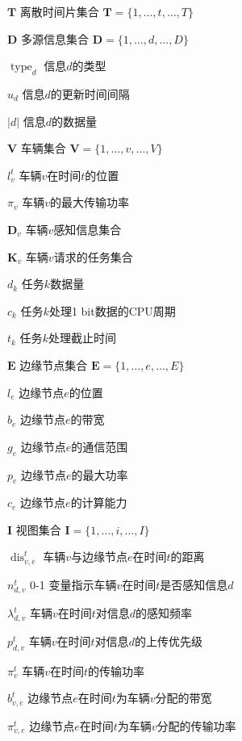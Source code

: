 \begin{denotation}[20mm][15mm]
	\item[$\mathbf{T}$] 离散时间片集合 $\mathbf{T}=\{1, \ldots, t, \ldots, T\}$
	\item[$\mathbf{D}$] 多源信息集合 $\mathbf{D}=\{1, \ldots, d, \ldots, D\}$
	\item[$\operatorname{type}_d$] 信息$d$的类型
	\item[$u_d$] 信息$d$的更新时间间隔
	\item[$\left|d\right|$] 信息$d$的数据量
	\item[$\mathbf{V}$] 车辆集合 $\mathbf{V}=\{1, \ldots, v, \ldots, V\}$
	\item[$l_{v}^{t}$] 车辆$v$在时间$t$的位置
	\item[$\pi_{v}$] 车辆$v$的最大传输功率
	\item[$\mathbf{D}_v$] 车辆$v$感知信息集合
	\item[$\mathbf{K}_{v}$] 车辆$v$请求的任务集合
	\item[$d_{k}$] 任务$k$数据量
	\item[$c_{k}$] 任务$k$处理1 bit数据的CPU周期
	\item[$t_{k}$] 任务$k$处理截止时间
	\item[$\mathbf{E}$] 边缘节点集合 $\mathbf{E}=\{1, \ldots, e, \ldots, E\}$
	\item[$l_{e}$] 边缘节点$e$的位置
	\item[$b_{e}$] 边缘节点$e$的带宽
	\item[$g_{e}$] 边缘节点$e$的通信范围
	\item[$p_{e}$] 边缘节点$e$的最大功率
	\item[$c_{e}$] 边缘节点$e$的计算能力
	\item[$\mathbf{I}$] 视图集合 $\mathbf{I}=\{1, \ldots, i, \ldots, I\}$
	\item[$\operatorname{dis}_{v, e}^{t}$] 车辆$v$与边缘节点$e$在时间$t$的距离
	\item[$n_{d, v}^t$] 0-1 变量指示车辆$v$在时间$t$是否感知信息$d$
	\item[$\lambda_{d, v}^{t}$] 车辆$v$在时间$t$对信息$d$的感知频率
	\item[$p_{d, v}^{t}$] 车辆$v$在时间$t$对信息$d$的上传优先级
	\item[$\pi_{v}^t$] 车辆$v$在时间$t$的传输功率
	\item[$b_{v, e}^{t}$] 边缘节点$e$在时间$t$为车辆$v$分配的带宽
	\item[$\pi_{v, e}^{t}$] 边缘节点$e$在时间$t$为车辆$v$分配的传输功率

\end{denotation}
